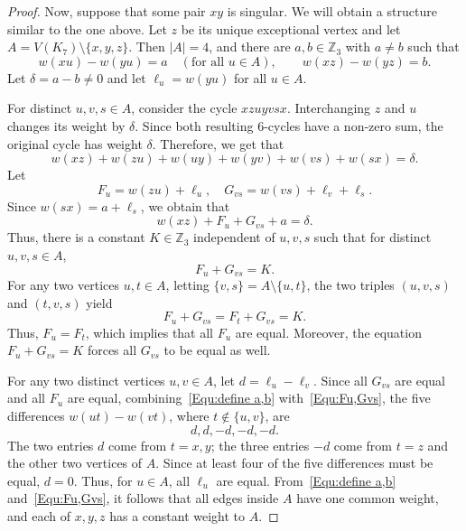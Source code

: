 \documentclass[11pt]{article}
\theoremstyle{remark}
\newcommand{\Z}{\mathbb Z}
\begin{document}
\begin{proof}
    Now, suppose that some pair $xy$ is singular.
    We will obtain a structure similar to the one above.
    Let $z$ be its unique exceptional vertex and let
    $A=V(K_7)\setminus\{x,y,z\}.$
    Then $|A|=4$, and there are $a,b\in\Z_3$ with $a\ne b$ such that
    \begin{equation}\label{Equ:define a,b}
        w(xu)-w(yu)=a\quad(\text{for all } u\in A),
        \qquad
        w(xz)-w(yz)=b.
    \end{equation}
    Let $\delta=a-b\ne0$ and let $\ell_u=w(yu)$ for all $u\in A$.

    For distinct $u,v,s\in A$, consider the cycle $xzuyvsx$.
    Interchanging $z$ and $u$ changes its weight by $\delta$.
    Since both resulting $6$-cycles have a non-zero sum, the original cycle has weight $\delta$.
    Therefore, we get that
    \[
        w(xz)+w(zu)+w(uy)+w(yv)+w(vs)+w(sx)=\delta.
    \]
    Let
    \begin{equation}\label{Equ:Fu,Gvs}
        F_u=w(zu)+\ell_u, \quad G_{vs}=w(vs)+\ell_v+\ell_s.
    \end{equation}
    Since $w(sx)=a+\ell_s$, we obtain that
    \[
        w(xz)+F_u+G_{vs}+a=\delta.
    \]
    Thus, there is a constant $K\in \Z_3$ independent of $u,v,s$ such that for distinct $u,v,s\in A$,
    \[
        F_u+G_{vs}=K.
    \]
    For any two vertices $u,t\in A$, letting $\{v,s\}=A\setminus\{u,t\}$, the two triples $(u,v,s)$ and $(t,v,s)$ yield
    \[
        F_u+G_{vs}=F_t+G_{vs}=K.
    \]
    Thus, $F_u=F_t$, which implies that all $F_u$ are equal.
    Moreover, the equation $F_u+G_{vs}=K$ forces all $G_{vs}$ to be equal as well.

    For any two distinct vertices $u,v\in A$, let $d=\ell_u-\ell_v$. Since all $G_{vs}$ are equal and all $F_u$ are equal, combining~\eqref{Equ:define a,b} with~\eqref{Equ:Fu,Gvs}, the five differences $w(ut)-w(vt)$, where $t\notin\{u,v\}$, are
    \[
        d,d,-d,-d,-d.
    \]
    The two entries $d$ come from $t=x,y$; the three entries $-d$ come from $t=z$ and the other two vertices of $A$.
    Since at least four of the five differences must be equal, $d=0$.
    Thus, for $u\in A$, all $\ell_u$ are equal.
    From~\eqref{Equ:define a,b} and~\eqref{Equ:Fu,Gvs}, it follows that all edges inside $A$ have one common weight, and each of $x,y,z$ has a constant weight to $A$.


\end{proof}
\end{document}
